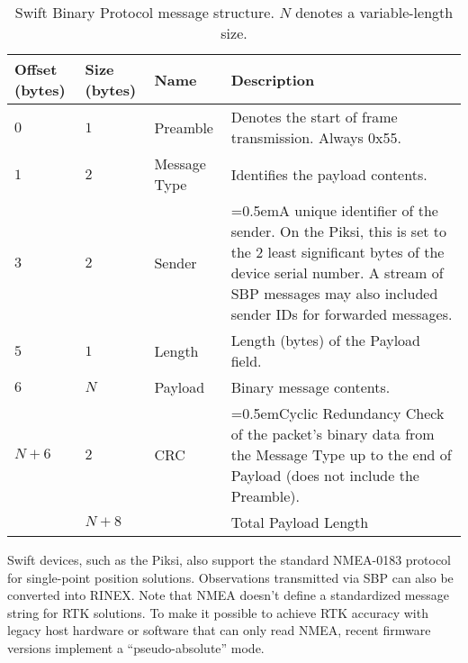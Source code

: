 \documentclass{article}
\numberwithin{table}{subsection}
\numberwithin{field}{subsection}
\begin{document}
\begin{table}[h]
  \centering
  \begin{tabularx}{\textwidth}{aaaX}
    \toprule
    Offset (bytes) & Size (bytes) & Name & Description \\
    \midrule
    $0$ & $1$ & {Preamble} & Denotes the start of frame transmission. Always 0x55. \\
    $1$ & $2$ & {Message Type} & Identifies the payload contents. \\
    $3$ & $2$ & {Sender} & \hangindent=0.5em{A unique identifier of the sender. On the Piksi, this is set to the 2 least significant bytes of the device serial number. A stream of SBP messages may also included sender IDs for forwarded messages.} \\
    $5$ & $1$ & {Length} & Length (bytes) of the {Payload} field. \\
    $6$ & $N$ & {Payload} & Binary message contents. \\
    $N+6$ & $2$ & {CRC} & \hangindent=0.5em{Cyclic Redundancy Check of the packet's binary data from the Message Type up to the end of Payload (does not include the Preamble).} \\
    \midrule
    & $N+8$ & &Total Payload Length \\
    \bottomrule
  \end{tabularx}
  \caption{Swift Binary Protocol message structure. $N$ denotes a variable-length size.}
  \label{tab:message}
\end{table}

\begin{large}
Swift devices, such as the Piksi, also support the standard NMEA-0183
protocol for single-point position solutions. Observations transmitted
via SBP can also be converted into RINEX. Note that NMEA doesn't
define a standardized message string for RTK solutions. To make it
possible to achieve RTK accuracy with legacy host hardware or software
that can only read NMEA, recent firmware versions implement a
``pseudo-absolute'' mode.

\end{large}

\newpage
\end{document}
